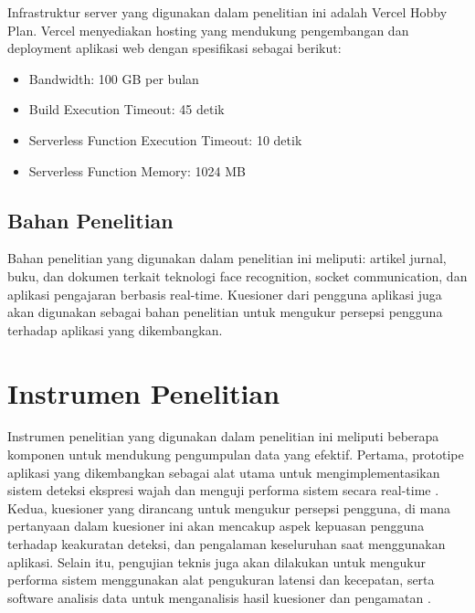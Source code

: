 \hspace{-32pt} Infrastruktur server yang digunakan dalam penelitian ini adalah Vercel Hobby Plan. Vercel menyediakan hosting yang mendukung pengembangan dan deployment aplikasi web dengan spesifikasi sebagai berikut:
\begin{itemize}
  \item Bandwidth: 100 GB per bulan
  \item Build Execution Timeout: 45 detik
  \item Serverless Function Execution Timeout: 10 detik
  \item Serverless Function Memory: 1024 MB
\end{itemize}

\subsection{Bahan Penelitian}
Bahan penelitian yang digunakan dalam penelitian ini meliputi: artikel jurnal, buku, dan dokumen terkait teknologi face recognition, socket communication, dan aplikasi pengajaran berbasis real-time. Kuesioner dari pengguna aplikasi juga akan digunakan sebagai bahan penelitian untuk mengukur persepsi pengguna terhadap aplikasi yang dikembangkan.

\section{Instrumen Penelitian}
Instrumen penelitian yang digunakan dalam penelitian ini meliputi beberapa komponen untuk mendukung pengumpulan data yang efektif. Pertama, prototipe aplikasi yang dikembangkan sebagai alat utama untuk mengimplementasikan sistem deteksi ekspresi wajah dan menguji performa sistem secara real-time \parencite{archanaRealTimeFace2022}. Kedua, kuesioner yang dirancang untuk mengukur persepsi pengguna, di mana pertanyaan dalam kuesioner ini akan mencakup aspek kepuasan pengguna terhadap keakuratan deteksi, dan pengalaman keseluruhan saat menggunakan aplikasi. Selain itu, pengujian teknis juga akan dilakukan untuk mengukur performa sistem menggunakan alat pengukuran latensi dan kecepatan, serta software analisis data untuk menganalisis hasil kuesioner dan pengamatan \parencite{budimanWebPerformanceOptimization2019}.

